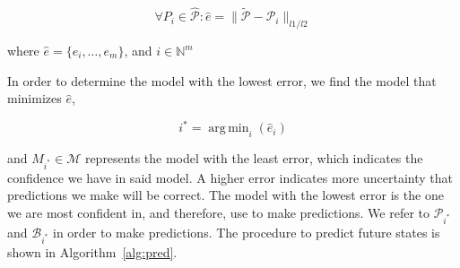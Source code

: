 \documentclass[letterpaper, 10 pt, conference]{ieeeconf}  %
\DeclareMathOperator*{\argmin}{arg\,min}
\newcommand\NB[1]{$\spadesuit$\footnote{NB: #1}}
\begin{document}
 
\begin{equation}
    \forall{P_i} \in \hat{\mathcal{P}}: \hat{e} = \lVert\tilde{\mathcal{P}}-\hat{\mathcal{P}}_{i}\rVert_{l1/l2}
\end{equation}

where $\hat{e} = \{e_i,\ldots,e_m\}$, and $i\in\mathbb{N}^m$

In order to determine the model with the lowest error, we find the model that minimizes $\hat{e}$,

\begin{equation}
    i^* = \argmin_{i}(\hat{e}_{i})
\end{equation}

and $M_{i^*}\in\mathcal{M}$ %
represents the model with the least error, which indicates the confidence we have in said model. A higher error indicates more uncertainty that predictions we make will be correct. The model with the lowest error is the one we are most confident in, and therefore, use to make predictions. We refer to $\mathcal{P}_{i^*}$ and $\mathcal{B}_{i^*}$ in order to make predictions. The procedure to predict future states is shown in Algorithm~\ref{alg:pred}. %


\end{document}
